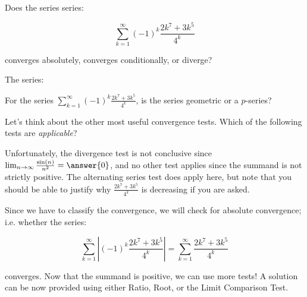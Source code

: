 \documentclass{ximera}
\author{Jim Talamo}
\begin{document}
\begin{exercise}

Does the series series:

\[
\sum_{k=1}^{\infty} (-1)^k \frac{2k^7+3k^5}{4^k}
\]

converges absolutely, converges conditionally, or diverge?

The series:

\begin{multipleChoice}
\end{multipleChoice}

\begin{hint}
For the series $\sum_{k=1}^{\infty}(-1)^k \frac{2k^7+3k^5}{4^k}$, is the series geometric or a $p$-series?

\begin{multipleChoice}
\end{multipleChoice}

Let's think about the other most useful convergence tests.  Which of the following tests are \emph{applicable}?

\begin{selectAll}
\end{selectAll}

Unfortunately, the divergence test is not conclusive since $\lim_{n \to \infty} \frac{\sin(n)}{n^2} = \answer{0}$, and no other test applies since the summand is not strictly positive.  The alternating series test does apply here, but note that you should be able to justify why $\frac{2k^7+3k^5}{4^k}$ is decreasing if you are asked.

Since we have to classify the convergence, we will check for absolute convergence; i.e. whether the series:

\[
\sum_{k=1}^{\infty} \left|(-1)^k \frac{2k^7+3k^5}{4^k} \right| = \sum_{k=1}^{\infty} \frac{2k^7+3k^5}{4^k}
\]

converges.  Now that the summand is positive, we can use more tests!  A solution can be now provided using either Ratio, Root, or the Limit Comparison Test.
\end{hint}

\end{exercise}
\end{document}
